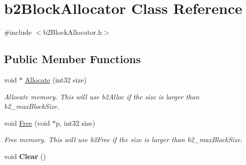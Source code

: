 \hypertarget{classb2_block_allocator}{}\section{b2\+Block\+Allocator Class Reference}
\label{classb2_block_allocator}


{\ttfamily \#include $<$b2\+Block\+Allocator.\+h$>$}

\subsection*{Public Member Functions}
\begin{DoxyCompactItemize}
\item 
void $\ast$ \hyperlink{classb2_block_allocator_a60b4b07a234adfe19cd1279805ed6519}{Allocate} (int32 size)\hypertarget{classb2_block_allocator_a60b4b07a234adfe19cd1279805ed6519}{}\label{classb2_block_allocator_a60b4b07a234adfe19cd1279805ed6519}

\begin{DoxyCompactList}\small\item\em Allocate memory. This will use b2\+Alloc if the size is larger than b2\+\_\+max\+Block\+Size. \end{DoxyCompactList}\item 
void \hyperlink{classb2_block_allocator_a945fdf86e260318b930a53dcc887ca8b}{Free} (void $\ast$p, int32 size)\hypertarget{classb2_block_allocator_a945fdf86e260318b930a53dcc887ca8b}{}\label{classb2_block_allocator_a945fdf86e260318b930a53dcc887ca8b}

\begin{DoxyCompactList}\small\item\em Free memory. This will use b2\+Free if the size is larger than b2\+\_\+max\+Block\+Size. \end{DoxyCompactList}\item 
void {\bfseries Clear} ()\hypertarget{classb2_block_allocator_a3d3bac86217eba9d1eb6dff2acee0d77}{}\label{classb2_block_allocator_a3d3bac86217eba9d1eb6dff2acee0d77}

\end{DoxyCompactItemize}
